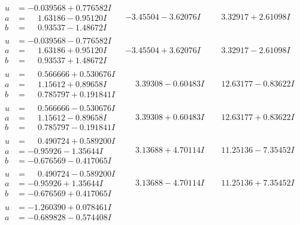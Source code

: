 \documentclass[1p]{elsarticle_modified}
\theoremstyle{definition}
\begin{document}
$$\begin{array}{c|c|c}
\begin{aligned}
u &= -0.039568 + 0.776582 I \\
a &= \phantom{-}1.63186 - 0.95120 I \\
b &= \phantom{-}0.93537 - 1.48672 I\end{aligned}
 & -3.45504 - 3.62076 I & \phantom{-}3.32917 + 2.61098 I \\ \hline\begin{aligned}
u &= -0.039568 - 0.776582 I \\
a &= \phantom{-}1.63186 + 0.95120 I \\
b &= \phantom{-}0.93537 + 1.48672 I\end{aligned}
 & -3.45504 + 3.62076 I & \phantom{-}3.32917 - 2.61098 I \\ \hline\begin{aligned}
u &= \phantom{-}0.566666 + 0.530676 I \\
a &= \phantom{-}1.15612 + 0.89658 I \\
b &= \phantom{-}0.785797 + 0.191841 I\end{aligned}
 & \phantom{-}3.39308 - 0.60483 I & \phantom{-}12.63177 - 0.83622 I \\ \hline\begin{aligned}
u &= \phantom{-}0.566666 - 0.530676 I \\
a &= \phantom{-}1.15612 - 0.89658 I \\
b &= \phantom{-}0.785797 - 0.191841 I\end{aligned}
 & \phantom{-}3.39308 + 0.60483 I & \phantom{-}12.63177 + 0.83622 I \\ \hline\begin{aligned}
u &= \phantom{-}0.490724 + 0.589200 I \\
a &= -0.95926 - 1.35644 I \\
b &= -0.676569 - 0.417065 I\end{aligned}
 & \phantom{-}3.13688 + 4.70114 I & \phantom{-}11.25136 - 7.35452 I \\ \hline\begin{aligned}
u &= \phantom{-}0.490724 - 0.589200 I \\
a &= -0.95926 + 1.35644 I \\
b &= -0.676569 + 0.417065 I\end{aligned}
 & \phantom{-}3.13688 - 4.70114 I & \phantom{-}11.25136 + 7.35452 I \\ \hline\begin{aligned}
u &= -1.260390 + 0.078461 I \\
a &= -0.689828 - 0.574408 I \\

\end{aligned}
\end{array}$$
\end{document}
